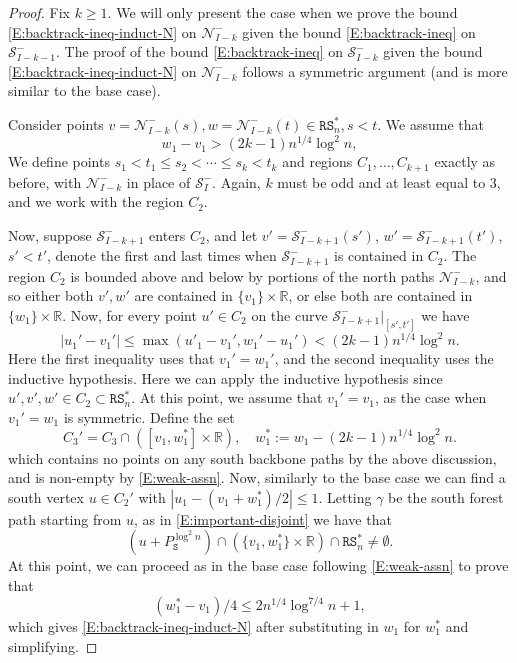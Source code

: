 \documentclass[11pt,twoside]{amsart}
\theoremstyle{plain}
\numberwithin{quest}{section}
\theoremstyle{remark}
\numberwithin{rem}{section}
\theoremstyle{definition}
\newcommand{\R}{\mathbb{R}}
\newcommand{\cS}{\mathcal{S}}
\newcommand{\cN}{\mathcal{N}}
\renewcommand{\tt}[1]{{\mathtt{#1}}}
\begin{document}
\begin{proof}
Fix $k \ge 1$. We will only present the case when we prove the bound \eqref{E:backtrack-ineq-induct-N} on $\cN_{I-k}^-$ given the bound \eqref{E:backtrack-ineq} on $\cS_{I-k-1}^-$. The proof of the bound  \eqref{E:backtrack-ineq} on $\cS_{I-k}^-$ given the bound \eqref{E:backtrack-ineq-induct-N} on $\cN_{I-k}^-$ follows a symmetric argument (and is more similar to the base case).

Consider points $v = \cN_{I-k}^-(s), w = \cN_{I-k}^-(t)  \in \tt{RS}_n^*, s < t$. We assume that 
\begin{equation}
	\label{E:weak-assn}
w_1 - v_1 > (2k - 1) n^{1/4} \log^{2} n,
\end{equation} 
We define points $s_1 < t_1 \le s_2 < \cdots \le s_k < t_k$ and regions $C_1, \dots, C_{k+1}$ exactly as before, with $\cN_{I-k}^-$ in place of $\cS_I^-$. Again, $k$ must be odd and at least equal to $3$, and we work with the region $C_2$. 

Now, suppose $\cS_{I-k+1}^-$ enters $C_2$, and let $v' = \cS_{I-k+1}^-(s')$, $w' = \cS_{I-k+1}^-(t')$, $s' < t'$, denote the first and last times when $\cS_{I-k+1}^-$ is contained in $C_2$. The region $C_2$ is bounded above and below by portions of the north paths $\cN_{I-k}^-$, and so either both $v', w'$ are contained in $\{v_1\} \times \R$, or else both are contained in $\{w_1\} \times \R$. Now, for every point $u' \in C_2$ on the curve $\cS_{I-k+1}^-|_{[s', t']}$ we have
\begin{equation}
	\label{E:IH}
 |u_1' - v_1'|\le \max(u'_1 - v_1', w_1' - u_1') < (2k - 1) n^{1/4} \log^{2} n.
\end{equation}
Here the first inequality uses that $v_1' = w_1'$, and the second inequality uses the inductive hypothesis. Here we can apply the inductive hypothesis since $u', v', w' \in C_2 \subset \tt{RS}_n^*$. At this point, we assume that $v_1' = v_1$, as the case when $v_1' = w_1$ is symmetric. Define the set
$$
C_3' = C_3 \cap ([v_1, w_1^*] \times \R), \quad w_1^* := w_1 - (2k - 1) n^{1/4} \log^{2} n.
$$
which contains no points on any south backbone paths by the above discussion, and is non-empty by \eqref{E:weak-assn}. Now, similarly to the base case we can find a south vertex $u \in C_2'$ with $|u_1 - (v_1 + w_1^*)/2| \le 1$. Letting $\gamma$ be the south forest path starting from $u$, as in \eqref{E:important-disjoint} we have that
\begin{equation*}
	(u + P^{\log^2 n}_\tt{S}) \cap (\{v_1, w_1^*\} \times \R) \cap \tt{RS}_n^* \ne \emptyset.
\end{equation*}
At this point, we can proceed as in the base case following \eqref{E:weak-assn} to prove that
$$
(w_1^* - v_1)/4 \le 2 n^{1/4} \log^{7/4} n + 1,
$$
which gives \eqref{E:backtrack-ineq-induct-N} after substituting in $w_1$ for $w_1^*$ and simplifying.
\end{proof}
\end{document}
